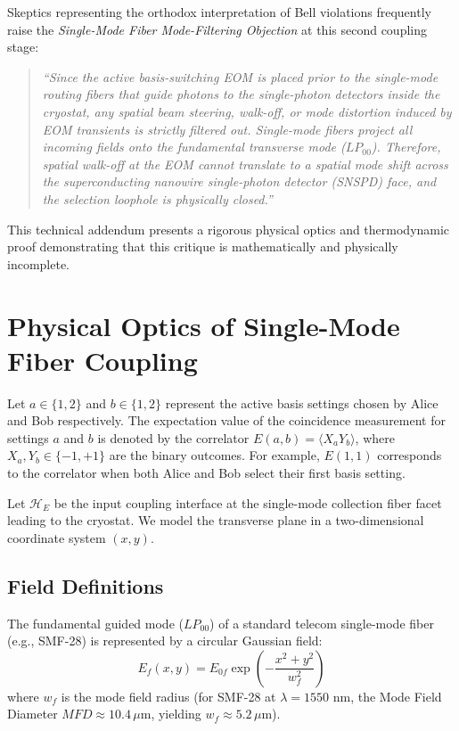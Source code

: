 \documentclass[11pt,twocolumn]{article}
\begin{document}
Skeptics representing the orthodox interpretation of Bell violations frequently raise the \textit{Single-Mode Fiber Mode-Filtering Objection} at this second coupling stage:
\begin{quote}
\textit{``Since the active basis-switching EOM is placed prior to the single-mode routing fibers that guide photons to the single-photon detectors inside the cryostat, any spatial beam steering, walk-off, or mode distortion induced by EOM transients is strictly filtered out. Single-mode fibers project all incoming fields onto the fundamental transverse mode ($LP_{00}$). Therefore, spatial walk-off at the EOM cannot translate to a spatial mode shift across the superconducting nanowire single-photon detector (SNSPD) face, and the selection loophole is physically closed.''}
\end{quote}

This technical addendum presents a rigorous physical optics and thermodynamic proof demonstrating that this critique is mathematically and physically incomplete. 

\section{Physical Optics of Single-Mode Fiber Coupling}

Let $a \in \{1, 2\}$ and $b \in \{1, 2\}$ represent the active basis settings chosen by Alice and Bob respectively. The expectation value of the coincidence measurement for settings $a$ and $b$ is denoted by the correlator $E(a, b) = \langle X_a Y_b \rangle$, where $X_a, Y_b \in \{-1, +1\}$ are the binary outcomes. For example, $E(1,1)$ corresponds to the correlator when both Alice and Bob select their first basis setting.

Let $\mathcal{H}_E$ be the input coupling interface at the single-mode collection fiber facet leading to the cryostat. We model the transverse plane in a two-dimensional coordinate system $(x, y)$.

\subsection{Field Definitions}
The fundamental guided mode ($LP_{00}$) of a standard telecom single-mode fiber (e.g., SMF-28) is represented by a circular Gaussian field:
\begin{equation}
E_f(x, y) = E_{0f} \exp\left( -\frac{x^2 + y^2}{w_f^2} \right)
\end{equation}
where $w_f$ is the mode field radius (for SMF-28 at $\lambda = 1550$ nm, the Mode Field Diameter $MFD \approx 10.4 \, \mu\text{m}$, yielding $w_f \approx 5.2 \, \mu\text{m}$).
\end{document}
